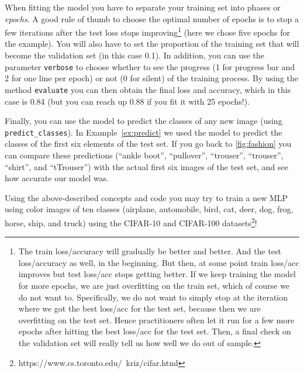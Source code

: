 When fitting the model you have to separate your training set into phases or \textit{epochs}. A good rule of thumb to choose the optimal number of epochs is to stop a few iterations after the test loss stops improving\footnote{The train loss/accuracy will gradually be better and better. And the test loss/accuracy as well, in the beginning. But then, at some point train loss/acc improves but test loss/acc stops getting better. If we keep training the model for more epochs, we are just overfitting on the train set, which of course we do not want to. Specifically, we do not want to simply stop at the iteration where we got the best loss/acc for the test set, because then we are overfitting on the test set. Hence practitioners often let it run for a few more epochs after hitting the best loss/acc for the test set. Then, a final check on the validation set will really tell us how well we do out of sample.}   (here we chose five epochs for the example). You will also have to set the proportion of the training set that will become the validation set (in this case 0.1). In addition, you can use the parameter \texttt{verbose} to choose whether to see the progress (1 for progress bar and 2 for one line per epoch) or not (0 for silent) of the training process. By using the method \texttt{evaluate} you can then obtain the final loss and accuracy, which in this case is 0.84 (but you can reach up 0.88 if you fit it with 25 epochs!).


Finally, you can use the model to predict the classes of any new image (using \texttt{predict\_classes}). In Example~\ref{ex:predict} we used the model to predict the classes of the first six elements of the test set. If you go back to \ref{fig:fashion} you can compare these predictions  (``ankle boot'', ``pullover'', ``trouser'', ``trouser'', ``shirt'', and ``tTrouser'') with the actual first six images of the test set, and see how accurate our model was.


Using the above-described concepts and code you may try to train a new MLP using color images of ten classes (airplane, automobile, bird, cat, deer, dog, frog, horse, ship, and truck) using the CIFAR-10 and CIFAR-100 datasets\footnote{https://www.cs.toronto.edu/~kriz/cifar.html}!



